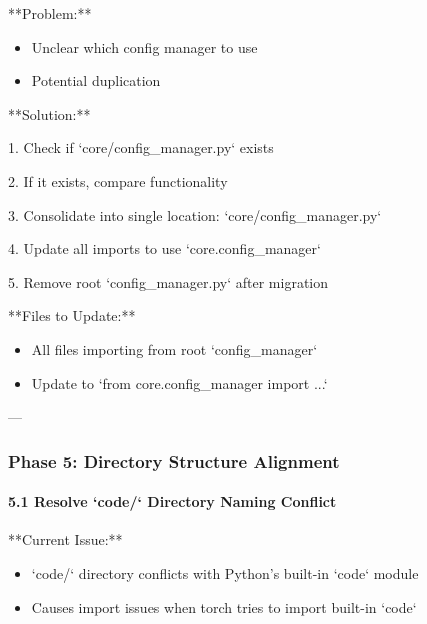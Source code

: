 \documentclass[11pt,a4paper]{article}
\begin{document}
**Problem:**

\begin{itemize}
\item Unclear which config manager to use
\end{itemize}

\begin{itemize}
\item Potential duplication
\end{itemize}

**Solution:**

1. Check if `core/config\_manager.py` exists

2. If it exists, compare functionality

3. Consolidate into single location: `core/config\_manager.py`

4. Update all imports to use `core.config\_manager`

5. Remove root `config\_manager.py` after migration

**Files to Update:**

\begin{itemize}
\item All files importing from root `config_manager`
\end{itemize}

\begin{itemize}
\item Update to `from core.config_manager import ...`
\end{itemize}

---

\subsubsection{Phase 5: Directory Structure Alignment}

\paragraph{5.1 Resolve `code/` Directory Naming Conflict}

**Current Issue:**

\begin{itemize}
\item `code/` directory conflicts with Python's built-in `code` module
\end{itemize}

\begin{itemize}
\item Causes import issues when torch tries to import built-in `code`
\end{itemize}
\end{document}
